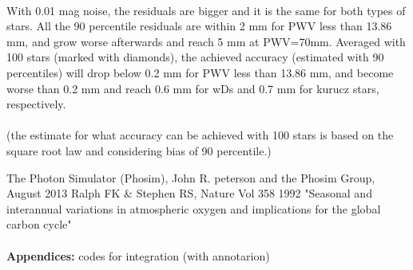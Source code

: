 \paragraph{}
With 0.01 mag noise, the residuals are bigger and it is the same for both types of stars. All the 90 percentile residuals are within 2 mm for PWV less than 13.86 mm, and grow worse afterwards and reach 5 mm at PWV=70mm. Averaged with 100 stars (marked with diamonds), the achieved accuracy (estimated with 90 percentiles) will drop below 0.2 mm for PWV less than 13.86 mm, and become worse than 0.2 mm and reach 0.6 mm for wDs and 0.7 mm for kurucz stars, respectively. 

\paragraph{}
(the estimate for what accuracy can be achieved with 100 stars is based on the square root law and considering bias of 90 percentile.)


\clearpage
\begin{thebibliography}{widestlabel}
The Photon Simulator (Phosim), John R. peterson and the Phosim Group, August 2013
Ralph FK \& Stephen RS, Nature Vol 358 1992 "Seasonal and interannual variations in atmospheric oxygen and implications for the global carbon cycle"
\end{thebibliography}

\paragraph{}
\textbf{Appendices: } codes for integration (with annotarion)
%